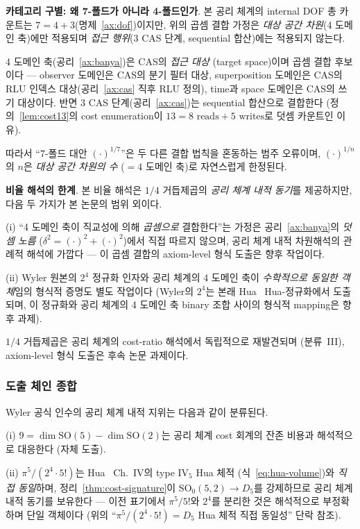 \documentclass[entropy,article,submit,pdftex,oneauthor]{Definitions/mdpi}
\begin{document}
\textbf{카테고리 구별: 왜 7-폴드가 아니라 4-폴드인가}. 본 공리 체계의 internal DOF 총 카운트는 $7 = 4 + 3$(명제~\ref{ax:dof})이지만, 위의 곱셈 결합 가정은 \emph{대상 공간 차원}(4 도메인 축)에만 적용되며 \emph{접근 행위}(3 CAS 단계, sequential 합산)에는 적용되지 않는다.

4 도메인 축(공리~\ref{ax:banya})은 CAS의 \emph{접근 대상} (target space)이며 곱셈 결합 후보이다 --- observer 도메인은 CAS의 분기 필터 대상, superposition 도메인은 CAS의 RLU 인덱스 대상(공리~\ref{ax:cas} 직후 RLU 정의), time과 space 도메인은 CAS의 쓰기 대상이다. 반면 3 CAS 단계(공리~\ref{ax:cas})는 sequential 합산으로 결합한다 (정의~\ref{lem:cost13}의 cost enumeration이 $13 = 8\text{ reads} + 5\text{ writes}$로 덧셈 카운트인 이유).

따라서 ``7-폴드 대안 $(\cdot)^{1/7}$''은 두 다른 결합 법칙을 혼동하는 범주 오류이며, $(\cdot)^{1/n}$의 $n$은 \emph{대상 공간 차원의 수} ($= 4$ 도메인 축)로 자연스럽게 한정된다.

\textbf{비율 해석의 한계}. 본 비율 해석은 $1/4$ 거듭제곱의 \emph{공리 체계 내적 동기}를 제공하지만, 다음 두 가지가 본 논문의 범위 외이다.

(i) ``4 도메인 축이 직교성에 의해 \emph{곱셈으로} 결합한다''는 가정은 공리~\ref{ax:banya}의 \emph{덧셈 노름} ($\delta^2 = (\cdot)^2 + (\cdot)^2$)에서 직접 따르지 않으며, 공리 체계 내적 차원해석의 관례적 해석에 가깝다 --- 이 곱셈 결합의 axiom-level 형식 도출은 향후 작업이다.

(ii) Wyler 원본의 $2^4$ 정규화 인자와 공리 체계의 4 도메인 축이 \emph{수학적으로 동일한 객체}임의 형식적 증명도 별도 작업이다 (Wyler의 $2^4$는 본래 Hua~\cite{hua1963} Hua-정규화에서 도출되며, 이 정규화와 공리 체계의 4 도메인 축 binary 조합 사이의 형식적 mapping은 향후 과제).

$1/4$ 거듭제곱은 공리 체계의 cost-ratio 해석에서 독립적으로 재발견되며 (분류~III), axiom-level 형식 도출은 후속 논문 과제이다.

\subsubsection{도출 체인 종합}

Wyler 공식 인수의 공리 체계 내적 지위는 다음과 같이 분류된다.

(i) $9 = \dim\mathrm{SO}(5)-\dim\mathrm{SO}(2)$는 공리 체계 cost 회계의 잔존 비용과 해석적으로 대응한다 (자체 도출).

(ii) $\pi^5/(2^4 \cdot 5!)$는 Hua~\cite{hua1963} Ch.~IV의 type IV$_5$ Hua 체적 (식~\eqref{eq:hua-volume})와 \emph{직접 동일}하며, 정리~\ref{thm:cost-signature}이 $\mathrm{SO}_0(5,2) \to D_5$를 강제하므로 공리 체계 내적 동기를 보유한다 — 이전 표기에서 $\pi^5/5!$와 $2^4$를 분리한 것은 해석적으로 부정확하며 단일 객체이다 (위의 ``$\pi^5/(2^4 \cdot 5!) = D_5$ Hua 체적 직접 동일성'' 단락 참조).
\end{document}
